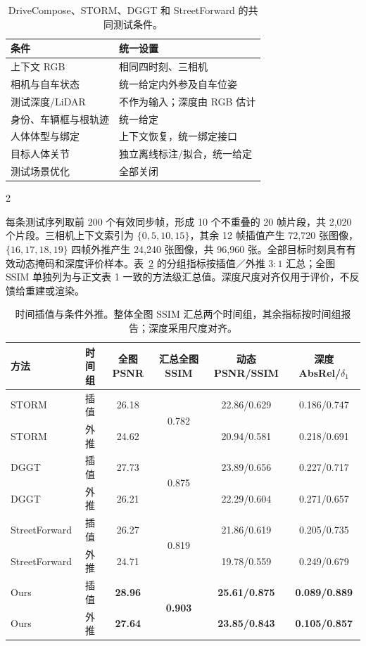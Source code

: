 \begin{table}[H]
\centering\small
\setlength{\tabcolsep}{4pt}
\caption{DriveCompose、STORM、DGGT 和 StreetForward 的共同测试条件。}
\label{tab:shared-inputs}
\begin{tabular}{@{}lp{}@{}}
\toprule
条件 & 统一设置 \\
\midrule
上下文 RGB & 相同四时刻、三相机 \\
相机与自车状态 & 统一给定内外参及自车位姿 \\
测试深度/LiDAR & 不作为输入；深度由 RGB 估计 \\
身份、车辆框与根轨迹 & 统一给定 \\
人体体型与绑定 & 上下文恢复，统一绑定接口 \\
目标人体关节 & 独立离线标注/拟合，统一给定 \\
测试场景优化 & 全部关闭 \\
\bottomrule
\end{tabular}
\end{table}
\begin{multicols}{2}

每条测试序列取前 200 个有效同步帧，形成 10 个不重叠的 20 帧片段，共 2,020 个片段。三相机上下文索引为 $\{0,5,10,15\}$，其余 12 帧插值产生 72,720 张图像，$\{16,17,18,19\}$ 四帧外推产生 24,240 张图像，共 96,960 张。全部目标时刻具有有效动态掩码和深度评价样本。表~\ref{tab:temporal-groups} 的分组指标按插值／外推 $3{:}1$ 汇总；全图 SSIM 单独列为与正文表 1 一致的方法级汇总值。深度尺度对齐仅用于评价，不反馈给重建或渲染。

\end{multicols}
\begin{table}[H]
\centering\small
\setlength{\tabcolsep}{4pt}
\caption{时间插值与条件外推。整体全图 SSIM 汇总两个时间组，其余指标按时间组报告；深度采用尺度对齐。}
\label{tab:temporal-groups}
\begin{tabular}{@{}lccccc@{}}
\toprule
方法 & 时间组 & 全图 PSNR & 汇总全图 SSIM & 动态 PSNR/SSIM & 深度 AbsRel/$\delta_1$ \\
\midrule
STORM & 插值 & 26.18 & \multirow{2}{*}{0.782} & 22.86/0.629 & 0.186/0.747 \\
STORM & 外推 & 24.62 &  & 20.94/0.581 & 0.218/0.691 \\
DGGT & 插值 & 27.73 & \multirow{2}{*}{0.875} & 23.89/0.656 & 0.227/0.717 \\
DGGT & 外推 & 26.21 &  & 22.29/0.604 & 0.271/0.657 \\
StreetForward & 插值 & 26.27 & \multirow{2}{*}{0.819} & 21.86/0.619 & 0.205/0.735 \\
StreetForward & 外推 & 24.71 &  & 19.78/0.559 & 0.249/0.679 \\
Ours & 插值 & \textbf{28.96} & \multirow{2}{*}{\textbf{0.903}} & \textbf{25.61/0.875} & \textbf{0.089/0.889} \\
Ours & 外推 & \textbf{27.64} &  & \textbf{23.85/0.843} & \textbf{0.105/0.857} \\
\bottomrule
\end{tabular}
\end{table}
